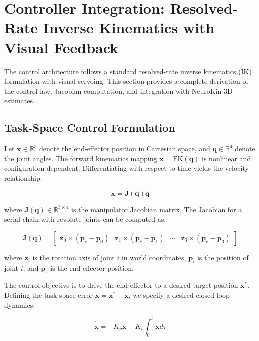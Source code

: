 \documentclass[12pt,a4paper,oneside]{report}
\begin{document}
\section{Controller Integration: Resolved-Rate Inverse Kinematics with Visual Feedback}

The control architecture follows a standard resolved-rate inverse kinematics (IK) formulation with visual servoing. This section provides a complete derivation of the control law, Jacobian computation, and integration with NeuroKin-3D estimates.

\subsection{Task-Space Control Formulation}
\label{subsec:task_space_control_formulation}

Let $\mathbf{x} \in \mathbb{R}^3$ denote the end-effector position in Cartesian space, and $\mathbf{q} \in \mathbb{R}^4$ denote the joint angles. The forward kinematics mapping $\mathbf{x} = \text{FK}(\mathbf{q})$ is nonlinear and configuration-dependent. Differentiating with respect to time yields the velocity relationship:

\begin{equation}
\dot{\mathbf{x}} = \mathbf{J}(\mathbf{q}) \dot{\mathbf{q}}
\end{equation}

where $\mathbf{J}(\mathbf{q}) \in \mathbb{R}^{3 \times 4}$ is the manipulator Jacobian matrix. The Jacobian for a serial chain with revolute joints can be computed as:

\begin{equation}
\mathbf{J}(\mathbf{q}) = \begin{bmatrix}
\mathbf{z}_0 \times (\mathbf{p}_e - \mathbf{p}_0) & \mathbf{z}_1 \times (\mathbf{p}_e - \mathbf{p}_1) & \cdots & \mathbf{z}_3 \times (\mathbf{p}_e - \mathbf{p}_3)
\end{bmatrix}
\end{equation}

where $\mathbf{z}_i$ is the rotation axis of joint $i$ in world coordinates, $\mathbf{p}_i$ is the position of joint $i$, and $\mathbf{p}_e$ is the end-effector position.

The control objective is to drive the end-effector to a desired target position $\mathbf{x}^*$. Defining the task-space error $\tilde{\mathbf{x}} = \mathbf{x}^* - \mathbf{x}$, we specify a desired closed-loop dynamics:

\begin{equation}
\dot{\tilde{\mathbf{x}}} = -K_p \tilde{\mathbf{x}} - K_i \int_0^t \tilde{\mathbf{x}} d\tau
\end{equation}
\end{document}
